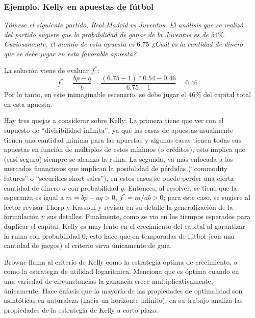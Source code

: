 \subsubsection{Ejemplo. Kelly en apuestas de fútbol}

\emph{Tómese el siguiente partido, Real Madrid vs Juventus. El análisis que se realizó del partido sugiere que la probabilidad de ganar de la Juventus es de $54\%$. Curiosamente, el momio de esta apuesta es $6.75$
¿Cuál es la cantidad de dinero que se debe jugar en esta favorable apuesta?}\linebreak[2]


La solución viene de evaluar $f^*$:
\[f^* = \frac{bp -q}{b} = \frac{(6.75-1)*0.54 - 0.46}{6.75-1} = 0.46\]
Por lo tanto, en este inimaginable escenario, se debe jugar el $46\%$ del capital total en esta apuesta.
\linebreak[2]



Hay tres quejas a considerar sobre Kelly: La primera tiene que ver con el supuesto de ``divisibilidad infinita'', ya que las casas de apuestas usualmente tienen una cantidad mínima para las apuestas y algunas casas tienen todas sus apuestas en función de múltiplos de estos mínimos (o créditos), esto implica que  (casi seguro) siempre se alcanza la ruina. La segunda, va más enfocada a los mercados financieros que implican la posibilidad de pérdidas (``commodity futures'' o ``securities short sales''), en estos casos se puede perder una cierta cantidad de dinero $a$ con probabilidad $q$. Entonces, al resolver, se tiene que la esperanza es igual a $m=bp-aq>0$, $f^*=m/ab >0$; para este caso, se sugiere al lector revisar Thorp y Kassouf \cite{thorp1967beat} y revisar en su detalle la generalización de la formulación y sus detalles. Finalmente, como se vio en los tiempos esperados para duplicar el capital, Kelly es muy lento en el crecimiento del capital al garantizar la ruina con probabilidad $0$; esto hace que en temporadas de fútbol (con una cantidad de juegos) el criterio sirva únicamente de guía.

Browne \cite{browne2000can} llama al criterio de Kelly \cite{kelly1956new} como la estrategia óptima de crecimiento, o como la estrategia de utilidad logarítmica. Menciona que es óptima cuando en una variedad de circunstancias la ganancia crece multiplicativamente, únicamente. Hace énfasis que la mayoría de las propiedades de optimalidad son asintóticas en naturaleza (hacia un horizonte infinito), en su trabajo analiza las propiedades de la estrategia de Kelly a corto plazo.


